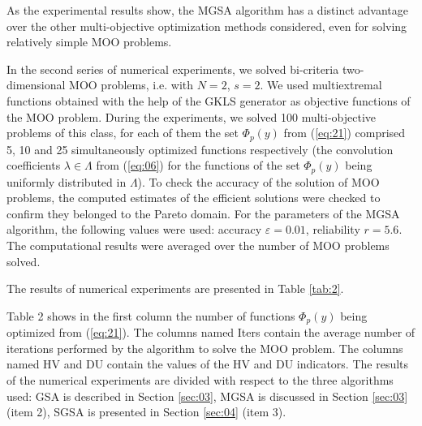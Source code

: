 \documentclass[runningheads]{llncs}
\begin{document}
As the experimental results show, the MGSA algorithm has a distinct advantage over the other multi-objective optimization methods considered, even for solving relatively simple MOO problems.

   In the second series of numerical experiments, we solved bi-criteria two-dimensional MOO problems, i.e. with $N = 2$, $s = 2$. We used multiextremal functions obtained with the help of the GKLS generator \cite{c43} as objective functions of the MOO problem. During the experiments, we solved 100 multi-objective problems of this class, for each of them the set $\Phi_p (y)$ from (\ref{eq:21}) comprised 5, 10 and 25 simultaneously optimized functions respectively (the convolution coefficients $\lambda \in \Lambda$ from (\ref{eq:06}) for the functions of the set $\Phi_p (y)$ being uniformly distributed in $\Lambda$). To check the accuracy of the solution of MOO problems, the computed estimates of the efficient solutions were checked to confirm they belonged to the Pareto domain. For the parameters of the MGSA algorithm, the following values were used: accuracy $\varepsilon=0.01$,  reliability $r=5.6$. The computational results were averaged over the number of MOO problems solved.

The results of numerical experiments are presented in Table \ref{tab:2}.

Table 2 shows in the first column the number of functions $\Phi_p (y)$ being optimized from (\ref{eq:21}).  The columns named Iters contain the average number of iterations performed by the algorithm to solve the MOO problem. The columns named HV and DU contain the values of the HV and DU indicators. The results of the numerical experiments are divided with respect to the three algorithms used: GSA is described in Section \ref{sec:03}, MGSA is discussed in Section \ref{sec:03} (item 2), SGSA is presented in Section \ref{sec:04} (item 3). 
\end{document}
